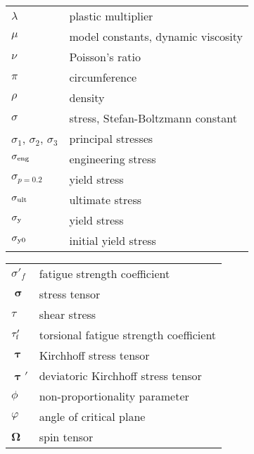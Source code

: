\begin{table}[htb]
\begin{tabular}{p{3cm}p{10.5cm}}
    $\lambda$ & plastic multiplier \\
    $\mu$ & model constants, dynamic viscosity \\
    $\nu$ & Poisson's ratio \\
    $\pi$ & circumference \\
    $\rho$ & density \\
    $\sigma$ & stress, Stefan-Boltzmann constant \\
    $\sigma_1$, $\sigma_2$, $\sigma_3$  & principal stresses \\
    $\sigma_{\rm{eng}}$  & engineering stress \\
    $\sigma_{p=0.2}$  & yield stress \\
    $\sigma_{\rm{ult}}$  & ultimate stress \\
    $\sigma_{\rm{y}}$  & yield stress \\
    $\sigma_{\rm{y0}}$  & initial yield stress \\
    \end{tabular}%
  \label{Tab:greek_1}%
\end{table}%

\begin{table}[htb]
  \centering
    \begin{tabular}{p{3cm}p{10.5cm}}
    $\sigma'_f$ & fatigue strength coefficient \\
    $\bm{\upsigma}$ & stress tensor \\
    $\tau$  & shear stress \\
    $\tau'_{\rm{f}}$ & torsional fatigue strength coefficient \\
    $\bm{\uptau}$ & Kirchhoff stress tensor \\
    $\bm{\uptau}'$ & deviatoric Kirchhoff stress tensor \\
    $\phi$ & non-proportionality parameter \\
    $\varphi$ & angle of critical plane \\
    $\bm{\Omega}$ & spin tensor \\
    \end{tabular}%
  \label{Tab:greek_1}%
\end{table}%

